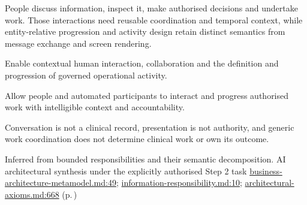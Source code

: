 People discuss information, inspect it, make authorised decisions and undertake work. Those interactions need reusable coordination and temporal context, while entity-relative progression and activity design retain distinct semantics from message exchange and screen rendering.



Enable contextual human interaction, collaboration and the definition and progression of governed operational activity.



Allow people and automated participants to interact and progress authorised work with intelligible context and accountability.



Conversation is not a clinical record, presentation is not authority, and generic work coordination does not determine clinical work or own its outcome.


Inferred from bounded responsibilities and their semantic decomposition. AI architectural synthesis under the explicitly authorised Step 2 task \hyperref[evidence:4bac85accd34ce0b]{business-architecture-metamodel.md:49}; \hyperref[evidence:be61392fefb4bb10]{information-responsibility.md:10}; \hyperref[evidence:27549d51551beae6]{architectural-axioms.md:668}
 (p.\,\pageref{cap:bec-governed-health-information-enablement})
